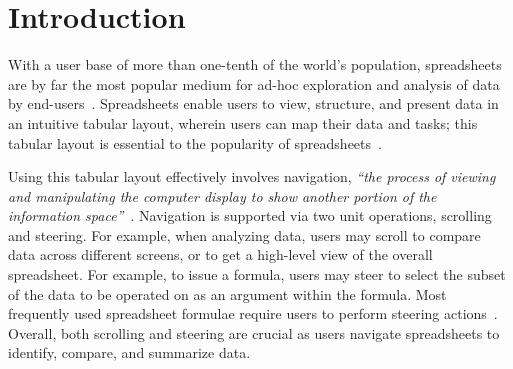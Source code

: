 
\section{Introduction}
\label{sec:intro}
With a user base of more than one-tenth of the world's population,
spreadsheets are by far the most popular medium for ad-hoc exploration
and analysis of data by end-users~\cite{excel-users}. 
Spreadsheets enable users to view, structure, and present data
in an intuitive tabular layout, wherein users can map their data and tasks;
this tabular layout is essential to
the popularity of spreadsheets~\cite{nardi1990spreadsheet}.

Using this tabular layout effectively involves
navigation, \ie
{\em ``the process of viewing and manipulating the computer display to
show another portion of the information space''}~\cite{nav-study}.
Navigation is supported
via two unit operations, scrolling and steering.
For example, when analyzing data, users may scroll
to compare data across different screens, or to get
a high-level view of the overall spreadsheet.
 For example, to issue a formula,
users may steer to select
the subset of the data
to be operated on as an argument within the formula.
Most frequently used spreadsheet formulae
require users to perform steering actions~\cite{bradbard2014spreadsheet, lawson2009comparison}.
Overall, both scrolling and steering are crucial as
users navigate spreadsheets to
identify, compare, and summarize data.

